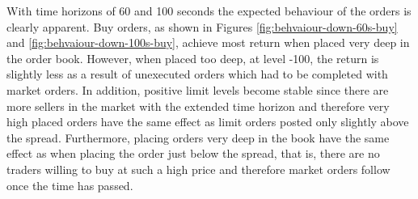 With time horizons of 60 and 100 seconds the expected behaviour of the orders is clearly apparent.
Buy orders, as shown in Figures \ref{fig:behvaiour-down-60s-buy} and \ref{fig:behvaiour-down-100s-buy}, achieve most return when placed very deep in the order book.
However, when placed too deep, at level -100, the return is slightly less as a result of unexecuted orders which had to be completed with market orders.
In addition, positive limit levels become stable since there are more sellers in the market with the extended time horizon and therefore very high placed orders have the same effect as limit orders posted only slightly above the spread.
Furthermore, placing orders very deep in the book have the same effect as when placing the order just below the spread, that is, there are no traders willing to buy at such a high price and therefore market orders follow once the time has passed.
\vfill
\newpage
